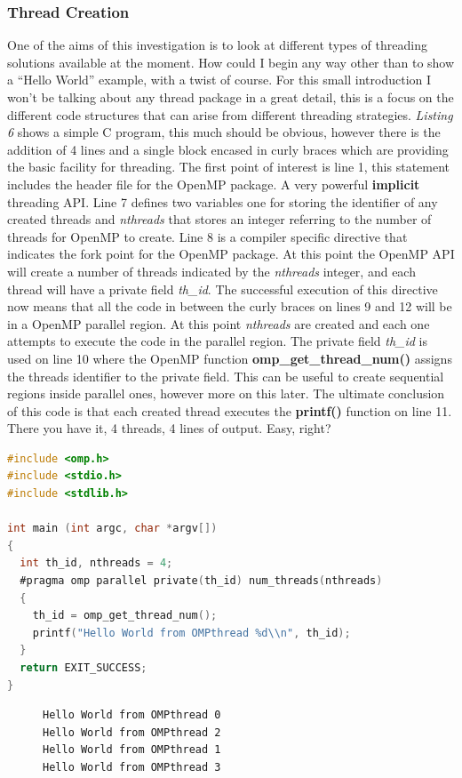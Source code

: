 \documentclass[11pt]{article} %
\begin{document}
\subsubsection{Thread Creation}
One of the aims of this investigation is to look at different types of threading solutions available at the moment. How could I begin any way other than to show a ``Hello World'' example, with a twist of course. For this small introduction I won't be talking about any thread package in a great detail, this is a focus on the different code structures that can arise from different threading strategies. {\it Listing 6} shows a simple C program, this much should be obvious, however there is the addition of 4 lines and a single block encased in curly braces which are providing the basic facility for threading. The first point of interest is line 1, this statement includes the header file for the OpenMP package. A very powerful {\bf implicit} threading API. Line 7 defines two variables one for storing the identifier of any created threads and {\it nthreads} that stores an integer referring to the number of threads for OpenMP to create. Line 8 is a compiler specific directive that indicates the fork point for the OpenMP package. At this point the OpenMP API will create a number of threads indicated by the {\it nthreads} integer, and each thread will have a private field {\it th\_id}. The successful execution of this directive now means that all the code in between the curly braces on lines 9 and 12 will be in a OpenMP parallel region. At this point {\it nthreads} are created and each one attempts to execute the code in the parallel region. The private field {\it th\_id} is used on line 10 where the OpenMP function {\bf omp\_get\_thread\_num()} assigns the threads identifier to the private field. This can be useful to create sequential regions inside parallel ones, however more on this later. The ultimate conclusion of this code is that each created thread executes the {\bf printf()} function on line 11. There you have it, 4 threads, 4 lines of output. Easy, right?
\begin{lstlisting}[language=C, caption={Hello World from OpenMP}]
#include <omp.h>
#include <stdio.h>
#include <stdlib.h>
 
int main (int argc, char *argv[])
{
  int th_id, nthreads = 4;
  #pragma omp parallel private(th_id) num_threads(nthreads)
  {
    th_id = omp_get_thread_num();
    printf("Hello World from OMPthread %d\\n", th_id);
  }
  return EXIT_SUCCESS;
}
\end{lstlisting}
\begin{figure}
\begin{verbatim}
Hello World from OMPthread 0
Hello World from OMPthread 2
Hello World from OMPthread 1
Hello World from OMPthread 3
\end{verbatim}
\end{figure}
\end{document}
